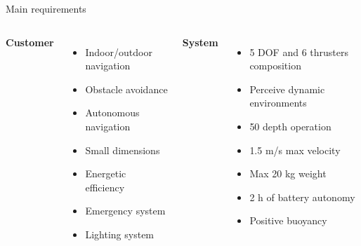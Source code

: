 \begin{frame}[t]{Main requirements}
  \transboxout[duration=0.5]
  \begin{columns}[c]
      \textbf{Customer}
      \begin{itemize}
        \item Indoor/outdoor navigation
        \item Obstacle avoidance
        \item Autonomous navigation
        \item Small dimensions
        \item Energetic efficiency
        \item Emergency system
        \item Lighting system
      \end{itemize}
      \textbf{System}
      \begin{itemize}
        \item 5 DOF and 6 thrusters composition
        \item Perceive dynamic environments
        \item 50 depth operation
        \item 1.5 m/s max velocity
        \item Max 20 kg weight
        \item 2 h of battery autonomy
        \item Positive buoyancy
      \end{itemize}
  \end{columns}
\end{frame}

